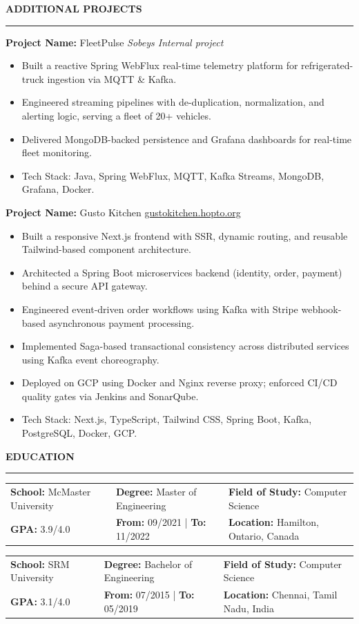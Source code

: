 \documentclass[9pt,letterpaper]{article}
\newlength{\sectionrulegap}
\newlength{\sectioncontentgap}
\newcommand{\resumesection}[1]{%
  \par\vspace{\sectionrulegap}%
  \noindent\textbf{\MakeUppercase{#1}}\par
  \nointerlineskip
  \vspace{\sectionrulegap}%
  \noindent\rule{\linewidth}{0.35pt}\par
  \nointerlineskip
  \vspace{\sectionrulegap}%
}
\newcommand{\sep}{ | }
\begin{document}
\resumesection{Additional Projects}
\textbf{Project Name:} FleetPulse \hfill \textit{Sobeys Internal project}\\
\begin{itemize}
  \item Built a reactive Spring WebFlux real-time telemetry platform for refrigerated-truck ingestion via MQTT \& Kafka.
  \item Engineered streaming pipelines with de-duplication, normalization, and alerting logic, serving a fleet of 20+ vehicles.
  \item Delivered MongoDB-backed persistence and Grafana dashboards for real-time fleet monitoring.
  \item Tech Stack: Java, Spring WebFlux, MQTT, Kafka Streams, MongoDB, Grafana, Docker.
\end{itemize}
\vspace{\sectioncontentgap}
\textbf{Project Name:} Gusto Kitchen \hfill \underline{\href{https://gustokitchen.hopto.org/}{gustokitchen.hopto.org}}\\
\begin{itemize}
  \item Built a responsive Next.js frontend with SSR, dynamic routing, and reusable Tailwind-based component architecture.
  \item Architected a Spring Boot microservices backend (identity, order, payment) behind a secure API gateway.
  \item Engineered event-driven order workflows using Kafka with Stripe webhook-based asynchronous payment processing.
  \item Implemented Saga-based transactional consistency across distributed services using Kafka event choreography.
  \item Deployed on GCP using Docker and Nginx reverse proxy; enforced CI/CD quality gates via Jenkins and SonarQube.
  \item Tech Stack: Next.js, TypeScript, Tailwind CSS, Spring Boot, Kafka, PostgreSQL, Docker, GCP.
\end{itemize}
\vspace{\sectioncontentgap}

\resumesection{Education}
\begin{tabularx}{\linewidth}{@{}X X X@{}}
\textbf{School:} McMaster University &
\textbf{Degree:} Master of Engineering &
\textbf{Field of Study:} Computer Science \\
\textbf{GPA:} 3.9/4.0 &
\textbf{From:} 09/2021 \sep \textbf{To:} 11/2022 &
\textbf{Location:} Hamilton, Ontario, Canada
\end{tabularx}
\vspace{\sectioncontentgap}
\begin{tabularx}{\linewidth}{@{}X X X@{}}
\textbf{School:} SRM University &
\textbf{Degree:} Bachelor of Engineering &
\textbf{Field of Study:} Computer Science \\
\textbf{GPA:} 3.1/4.0 &
\textbf{From:} 07/2015 \sep \textbf{To:} 05/2019 &
\textbf{Location:} Chennai, Tamil Nadu, India
\end{tabularx}
\end{document}
